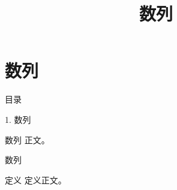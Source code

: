 \documentclass[aspectratio=169,10pt,fontset=fandol]{ctexbeamer}
\title{数列}
\begin{document}
\section{数列}
\begin{frame}[t,fragile]{目录}
\normalsize
{\color{blue}\normalsize 1. 数列\par}\vspace{0.22em}
\end{frame}
\begin{frame}[t,fragile]{数列}
\normalsize
{\normalsize
正文。
}
\end{frame}
\begin{frame}[t,fragile]{数列}
\normalsize
\begin{block}{定义}
{\normalsize
定义正文。
}
\end{block}
\end{frame}
\end{document}
